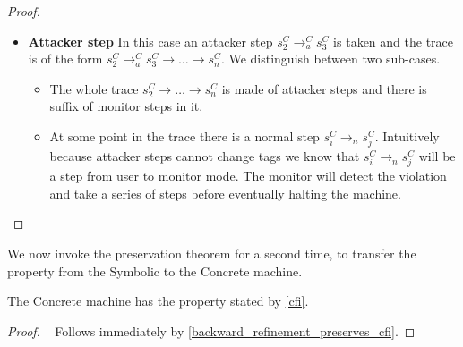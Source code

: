 \begin{proof}
\begin{itemize}
  \item \textbf{Attacker step} In this case an attacker step $s^C_2
    \to_a^{C} s^C_3$ is taken and the trace is of the form $s^C_2
    \to_a^{C} s^C_3 \to \ldots \to s^C_n$. We distinguish between
    two sub-cases.
    \begin{itemize}
    \item The whole trace $s^C_2 \to \ldots \to s^C_n$
      is made of attacker steps and there is suffix of monitor
      steps in it.
    \item At some point in the trace there is a normal step $s^C_i
      \to_n s^C_j$. Intuitively because attacker steps cannot change
      tags we know that $s^C_i \to_n s^C_j$ will be a step from user
      to monitor mode. The monitor will detect the violation and take
      a series of steps before eventually halting the machine.
      \end{itemize}
    \end{itemize}
\end{proof}

We now invoke the preservation theorem for a second time, to transfer
the \CFI property from the Symbolic to the Concrete machine.

\begin{theorem}\label{CFIconcrete}
The Concrete machine has the \CFI property stated by \cref{cfi}.
\end{theorem}
\begin{proof}
  ~ Follows immediately by \cref{backward_refinement_preserves_cfi}.
\end{proof}